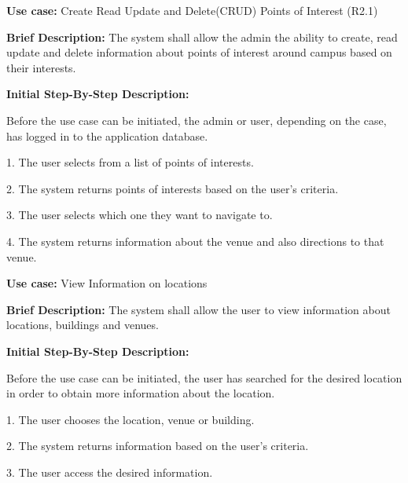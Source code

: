 ﻿\documentclass{article}
\begin{document}
\begin{flushleft}
    \textbf{Use case:} Create Read Update and Delete(CRUD) Points of Interest  (R2.1)
    \newline
    	
    \textbf{Brief Description:}
    \newline
    The system shall allow the admin the ability to create, read update and delete information about points of interest around campus based on their interests.
    \newline
    
    \textbf{Initial Step-By-Step Description:}
    
    Before the use case can be initiated, the admin or user, depending on the case, has logged in to the application database. 
	\newline    
	
1. The user selects from a list of points of interests.

2. The system returns points of interests based on the user's criteria.

3. The user selects which one they want to navigate to.

4. The system returns information about the venue and also directions to that venue.

\end{flushleft}

\begin{flushleft}
    \textbf{Use case:} View Information on locations
    \newline
    	
    \textbf{Brief Description:}
    \newline
    The system shall allow the user to view information about locations, buildings and venues.
    \newline
    
    \textbf{Initial Step-By-Step Description:}
    
    Before the use case can be initiated, the user has searched for the desired location in order to obtain more information about the location.
	\newline    
	
1. The user chooses the location, venue or building.

2. The system returns information based on the user's criteria. 

3. The user access the desired information.

\end{flushleft}
\end{document}

